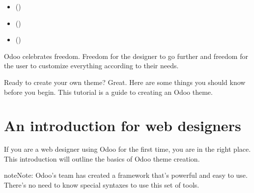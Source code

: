 \documentclass[a4paper,10pt,french]{sphinxmanual}
\begin{document}
\begin{sphinxShadowBox}
\begin{itemize}
\item {} 
\label{\detokenize{docs/tuts/autocad-tut02:id1}}{\hyperref[\detokenize{docs/tuts/autocad-tut02:an-introduction-for-web-designers}]{}} ()

\item {} 
\label{\detokenize{docs/tuts/autocad-tut02:id2}}{\hyperref[\detokenize{docs/tuts/autocad-tut02:from-common-cms-to-odoo}]{}} ()

\item {} 
\label{\detokenize{docs/tuts/autocad-tut02:id3}}{\hyperref[\detokenize{docs/tuts/autocad-tut02:flutuat-nec-mergitur-1}]{}} ()

\end{itemize}
\end{sphinxShadowBox}

Odoo celebrates freedom. Freedom for the designer to go further and
freedom for the user to customize everything according to their needs.

Ready to create your own theme? Great. Here are some things you should know before you begin. This tutorial is a guide to creating an Odoo theme.

\noindent{}


\section{An introduction for web designers}
\label{\detokenize{docs/tuts/autocad-tut02:an-introduction-for-web-designers}}
If you are a web designer using Odoo for the first time, you are in the right place.
This introduction will outline the basics of Odoo theme creation.

\begin{sphinxadmonition}{note}{Note:}
Odoo’s team has created a framework that’s powerful and easy to use. There’s no need to know special syntaxes to use this set of tools.
\end{sphinxadmonition}
\end{document}
